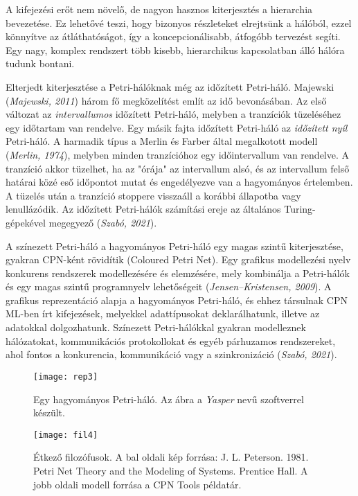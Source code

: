\documentclass[12pt]{article}
\begin{document}
A kifejezési erőt nem növelő, de nagyon hasznos kiterjesztés a hierarchia bevezetése. Ez lehetővé teszi, hogy bizonyos részleteket elrejtsünk a hálóból, ezzel könnyítve az átláthatóságot, így a koncepcionálisabb, átfogóbb tervezést segíti. Egy nagy, komplex rendszert több kisebb, hierarchikus kapcsolatban álló hálóra tudunk bontani.

Elterjedt kiterjesztése a Petri-hálóknak még az időzített Petri-háló. Majewski  (\textit{Majewski, 2011}) három fő megközelítést említ az idő bevonásában. Az első változat az \emph{intervallumos} időzített Petri-háló, melyben a tranzíciók tüzeléséhez egy időtartam van rendelve. Egy másik fajta időzített Petri-háló az \emph{időzített nyíl} Petri-háló. A harmadik típus a Merlin és Farber által megalkotott modell  (\textit{Merlin, 1974}), melyben minden tranzícióhoz egy időintervallum van rendelve. A tranzíció akkor tüzelhet, ha az "órája" az intervallum alsó, és az intervallum felső határai közé eső időpontot mutat és engedélyezve van a hagyományos értelemben. A tüzelés után a tranzíció stoppere visszaáll a korábbi állapotba vagy lenullázódik. Az időzített Petri-hálók számítási ereje az általános Turing-gépekével megegyező (\textit{Szabó, 2021}).

A színezett Petri-háló a hagyományos Petri-háló egy magas szintű kiterjesztése, gyakran CPN-ként rövidítik (Coloured Petri Net). Egy grafikus modellezési nyelv konkurens  rendszerek modellezésére és elemzésére, mely kombinálja a Petri-hálók és egy magas szintű programnyelv lehetőségeit  (\textit{Jensen–Kristensen, 2009}). A grafikus reprezentáció alapja a hagyományos Petri-háló, és ehhez társulnak CPN ML-ben írt kifejezések, melyekkel adattípusokat deklarálhatunk, illetve az adatokkal dolgozhatunk. Színezett Petri-hálókkal gyakran modelleznek hálózatokat, kommunikációs protokollokat és egyéb párhuzamos rendszereket, ahol fontos a konkurencia, kommunikáció vagy a szinkronizáció (\textit{Szabó, 2021}).

\begin{figure}
\texttt{[image: rep3]}
\caption{Egy hagyományos Petri-háló. Az ábra a \textit{Yasper} nevű szoftverrel készült.}
\end{figure}

\begin{figure}
\texttt{[image: fil4]}
\caption{Étkező filozófusok. A bal oldali kép forrása: J. L. Peterson. 1981. Petri Net Theory and the Modeling of Systems. Prentice Hall. A jobb oldali modell forrása a CPN Tools példatár.
}
\end{figure}
\end{document}
